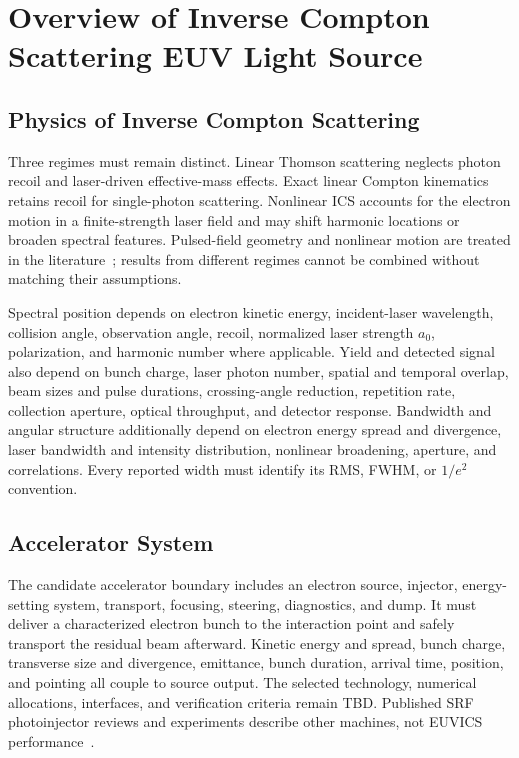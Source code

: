 \section{Overview of Inverse Compton Scattering EUV Light Source}

\subsection{Physics of Inverse Compton Scattering}

Three regimes must remain distinct. Linear Thomson scattering neglects photon
recoil and laser-driven effective-mass effects. Exact linear Compton kinematics
retains recoil for single-photon scattering. Nonlinear ICS accounts for the
electron motion in a finite-strength laser field and may shift harmonic
locations or broaden spectral features. Pulsed-field geometry and nonlinear
motion are treated in the literature~\cite{KrafftEtAl2005NonlinearThomson,HartemannWu2013Brightness};
results from different regimes cannot be combined without matching their
assumptions.

Spectral position depends on electron kinetic energy, incident-laser wavelength,
collision angle, observation angle, recoil, normalized laser strength $a_0$,
polarization, and harmonic number where applicable. Yield and detected signal
also depend on bunch charge, laser photon number, spatial and temporal overlap,
beam sizes and pulse durations, crossing-angle reduction, repetition rate,
collection aperture, optical throughput, and detector response. Bandwidth and
angular structure additionally depend on electron energy spread and divergence,
laser bandwidth and intensity distribution, nonlinear broadening, aperture, and
correlations. Every reported width must identify its RMS, FWHM, or $1/e^2$
convention.

\subsection{Accelerator System}

The candidate accelerator boundary includes an electron source, injector,
energy-setting system, transport, focusing, steering, diagnostics, and dump. It
must deliver a characterized electron bunch to the interaction point and safely
transport the residual beam afterward. Kinetic energy and spread, bunch charge,
transverse size and divergence, emittance, bunch duration, arrival time,
position, and pointing all couple to source output. The selected technology,
numerical allocations, interfaces, and verification criteria remain TBD.
Published SRF photoinjector reviews and experiments describe other machines,
not EUVICS performance~\cite{ArnoldTeichert2011SRFPhotoinjectors,PetrushinaEtAl2020SRFGun}.

